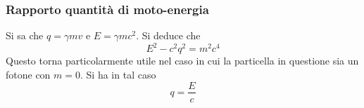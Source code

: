 \subsubsection{Rapporto quantità di moto-energia}
Si sa che $q=\gamma mv$ e $E=\gamma mc^2$. Si deduce che
\begin{equation*}
  E^2-c^2q^2=m^2c^4
\end{equation*}
Questo torna particolarmente utile nel caso in cui la particella in questione sia un fotone con
$m=0$. Si ha in tal caso
\begin{equation*}
  q=\frac{E}{c}
\end{equation*}
